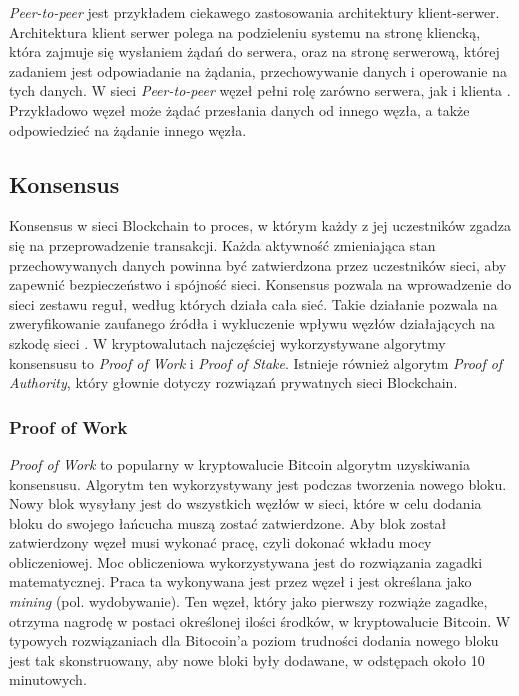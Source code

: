 \documentclass[a4paper,12pt]{book}
\begin{document}
\textit{Peer-to-peer} jest przykładem ciekawego zastosowania architektury klient-serwer. Architektura klient serwer polega na podzieleniu systemu na stronę kliencką, która zajmuje się wysłaniem żądań do serwera, oraz na stronę serwerową, której zadaniem jest odpowiadanie na żądania, przechowywanie danych i operowanie na tych danych. W sieci \textit{Peer-to-peer} węzeł pełni rolę zarówno serwera, jak i klienta \cite{p2pbib}. 
Przykładowo węzeł może żądać przesłania danych od innego węzła, a także odpowiedzieć na żądanie innego węzła.

\subsection{Konsensus}

Konsensus w sieci Blockchain to proces, w którym każdy z jej uczestników zgadza się na przeprowadzenie transakcji. Każda aktywność zmieniająca stan przechowywanych danych powinna być zatwierdzona przez uczestników sieci, aby zapewnić bezpieczeństwo i spójność sieci. Konsensus pozwala na wprowadzenie do sieci zestawu reguł, według których działa cała sieć. Takie działanie pozwala na zweryfikowanie zaufanego źródła i wykluczenie wpływu węzłów działających na szkodę sieci \cite{piechk}. W kryptowalutach najczęściej wykorzystywane algorytmy konsensusu to \textit{Proof of Work} i \textit{Proof of Stake}. Istnieje również algorytm \textit{Proof of Authority}, który głownie dotyczy rozwiązań prywatnych sieci Blockchain.

\subsubsection{Proof of Work}

\textit{Proof of Work} to popularny w kryptowalucie Bitcoin algorytm uzyskiwania konsensusu. Algorytm ten wykorzystywany jest podczas tworzenia nowego bloku. Nowy blok wysyłany jest do wszystkich węzłów w sieci, które w celu dodania bloku do swojego łańcucha muszą zostać zatwierdzone. Aby blok został zatwierdzony węzeł musi wykonać pracę, czyli dokonać wkładu mocy obliczeniowej. Moc obliczeniowa wykorzystywana jest do rozwiązania zagadki matematycznej. Praca ta wykonywana jest przez węzeł i jest określana jako \textit{mining} (pol. wydobywanie). Ten węzeł, który jako pierwszy rozwiąże zagadke, otrzyma nagrodę w postaci określonej ilości środków, w kryptowalucie Bitcoin. W typowych rozwiązaniach dla Bitocoin'a poziom trudności dodania nowego bloku jest tak skonstruowany, aby nowe bloki były dodawane, w odstępach około 10 minutowych\cite{pow-bitcoin}.
\end{document}
